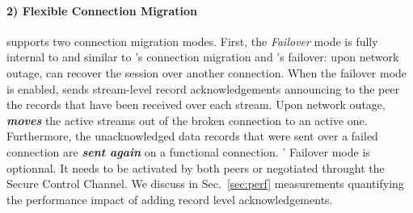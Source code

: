 
\paragraph*{2) Flexible Connection Migration} \tcpls supports two connection migration modes. First, the \textit{Failover} mode is fully internal to \tcpls and similar to \quic's connection migration and \mptcp's failover:
upon network outage, \tcpls can recover the session over another \tcp
connection. When the failover mode is enabled, \tcpls sends stream-level record
acknowledgements announcing to the peer the records that have been received
over each stream. Upon network outage, \tcpls \textbf{\textit{moves}} the
active streams out of the broken \tcp connection to an active one. Furthermore,
the unacknowledged data records that were sent over a failed \tcp connection are
\textbf{\textit{sent again}} on a functional \tcp connection.
\tcpls' Failover mode is optionnal. It needs to be activated by both peers or
negotiated throught the Secure Control Channel.
We discuss in Sec.~\ref{sec:perf} measurements quantifying the
performance impact of adding \tcpls record level acknowledgements.

